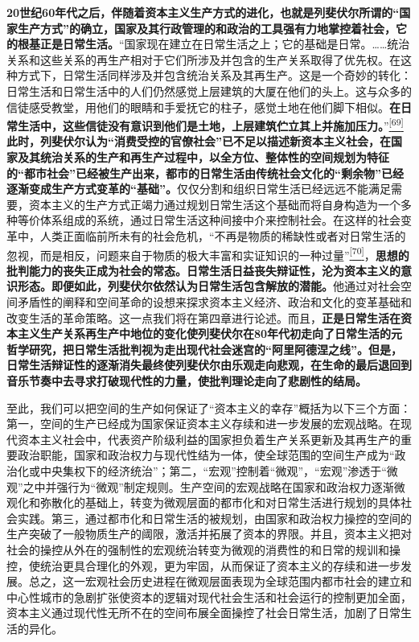 \documentclass[UTF8, fontset = sourcesans, a4paper, oneside, zihao =
-4, scheme=chinese, no-math, space=true]{ctexbook}
\begin{document}
\textbf{20世纪60年代之后，伴随着资本主义生产方式的进化，也就是列斐伏尔所谓的``国家生产方式''的确立，国家及其行政管理的和政治的工具强有力地掌控着社会，它的根基正是日常生活。}``国家现在建立在日常生活之上；它的基础是日常。……统治关系和这些关系的再生产相对于它们所涉及并包含的生产关系取得了优先权。在这种方式下，日常生活同样涉及并包含统治关系及其再生产。这是一个奇妙的转化：日常生活和日常生活中的人们仍然感觉上层建筑的大厦在他们的头上。这与众多的信徒感受教堂，用他们的眼睛和手爱抚它的柱子，感觉土地在他们脚下相似。\textbf{在日常生活中，这些信徒没有意识到他们是土地，上层建筑伫立其上并施加压力。}''\protect\hypertarget{part0007_split_004.htmlux5cux23w69}{}{}\protect\hyperlink{part0007_split_004.htmlux5cux23m69}{\textsuperscript{{[}69{]}}}\textbf{此时，列斐伏尔认为``消费受控的官僚社会''已不足以描述新资本主义社会，在国家及其统治关系的生产和再生产过程中，以全方位、整体性的空间规划为特征的``都市社会''已经被生产出来，都市的日常生活由传统社会文化的``剩余物''已经逐渐变成生产方式变革的``基础''。}仅仅分割和组织日常生活已经远远不能满足需要，资本主义的生产方式正竭力通过规划日常生活这个基础而将自身构造为一个多种等价体系组成的系统，通过日常生活这种间接中介来控制社会。在这样的社会变革中，人类正面临前所未有的社会危机，``不再是物质的稀缺性或者对日常生活的忽视，而是相反，问题来自于物质的极大丰富和实证知识的一种过量''\protect\hypertarget{part0007_split_004.htmlux5cux23w70}{}{}\protect\hyperlink{part0007_split_004.htmlux5cux23m70}{\textsuperscript{{[}70{]}}}，\textbf{思想的批判能力的丧失正成为社会的常态。日常生活日益丧失辩证性，沦为资本主义的意识形态。即便如此，列斐伏尔依然认为日常生活包含解放的潜能。}他通过对社会空间矛盾性的阐释和空间革命的设想来探求资本主义经济、政治和文化的变革基础和改变生活的革命策略。这一点我们将在第四章进行论述。而且，\textbf{正是日常生活在资本主义生产关系再生产中地位的变化使列斐伏尔在80年代初走向了日常生活的元哲学研究，把日常生活批判视为走出现代社会迷宫的``阿里阿德涅之线''。但是，日常生活辩证性的逐渐消失最终使列斐伏尔由乐观走向悲观，在生命的最后退回到音乐节奏中去寻求打破现代性的力量，使批判理论走向了悲剧性的结局。}

至此，我们可以把空间的生产如何保证了``资本主义的幸存''概括为以下三个方面：第一，空间的生产已经成为国家保证资本主义存续和进一步发展的宏观战略。在现代资本主义社会中，代表资产阶级利益的国家担负着生产关系更新及其再生产的重要政治职能，国家和政治权力与现代性结为一体，使全球范围的空间生产成为``政治化或中央集权下的经济统治''；第二，``宏观''控制着``微观''，``宏观''渗透于``微观''之中并强行为``微观''制定规则。生产空间的宏观战略在国家和政治权力逐渐微观化和弥散化的基础上，转变为微观层面的都市化和对日常生活进行规划的具体社会实践。第三，通过都市化和日常生活的被规划，由国家和政治权力操控的空间的生产突破了一般物质生产的阈限，激活并拓展了资本的界限。并且，资本主义把对社会的操控从外在的强制性的宏观统治转变为微观的消费性的和日常的规训和操控，使统治更具合理化的外观，更为牢固，从而保证了资本主义的存续和进一步发展。总之，这一宏观社会历史进程在微观层面表现为全球范围内都市社会的建立和中心性城市的急剧扩张使资本的逻辑对现代社会生活和社会运行的控制更加全面，资本主义通过现代性无所不在的空间布展全面操控了社会日常生活，加剧了日常生活的异化。
\end{document}

